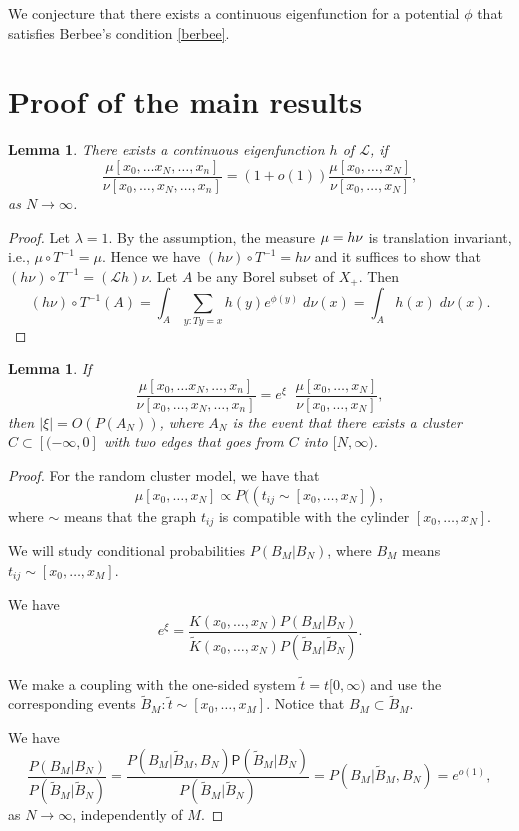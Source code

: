 \documentclass[11pt, a4paper, oneside]{article}
\newtheorem{lem}[thm]{Lemma}
\theoremstyle{definition}
\theoremstyle{remark}
\renewcommand{\P}{\mathsf{P}}
\providecommand{\tl}{\tilde}
\begin{document}
We conjecture that there exists a continuous eigenfunction for a potential
$\phi$ that satisfies Berbee's condition \eqref{berbee}.

\section{Proof of the main results}\noindent
\begin{lem}
  There exists a continuous eigenfunction $h$ of ${\mathcal L}$, if
$$\frac{\mu[x_0,\ldots x_N, \ldots, x_n]}{\nu[x_0,\ldots, x_N, \ldots, x_n]}=(1+o(1)) \frac{\mu[x_0,\ldots, x_N]}{\nu[x_0, \ldots, x_N]},$$
as $N\to \infty$.
\end{lem}
\begin{proof}
  Let $\lambda=1$. By the assumption, the measure $\mu= h \nu$ is translation
  invariant, i.e., $\mu\circ T^{-1}=\mu$. Hence we have $(h\nu)\circ
  T^{-1}=h\nu$ and it suffices to show that $(h\nu)\circ T^{-1}=({\mathcal
    L}h)\nu$. Let $A$ be any Borel subset of $X_+$. Then
$$(h\nu)\circ T^{-1} (A)=\int_A \sum_{y: Ty=x} h(y)e^{\phi(y)}\; d\nu(x)=\int_A h(x)\; d\nu(x).$$
\end{proof}

\begin{lem}
  If $$\frac{\mu[x_0,\ldots x_N, \ldots, x_n]}{\nu[x_0,\ldots, x_N, \ldots,
    x_n]}=e^{\xi}\; \; \frac{\mu[x_0,\ldots, x_N]}{\nu[x_0, \ldots, x_N]},$$
then $|\xi|=O(P(A_N))$, where $A_N$ is the event that there exists a cluster
$C\subset [(-\infty, 0]$ with two edges that goes from $C$ into $[N,\infty)$.
\end{lem}
\begin{proof}
For the random cluster model, we have that
$$\mu[x_0,\ldots, x_N]\propto P((t_{ij} \sim [x_0, \ldots, x_N]),$$
where $\sim$ means that the graph $t_{ij}$ is compatible with the cylinder
$[x_0,\ldots, x_N]$.

We will study conditional probabilities $P(B_M|B_N)$, where $B_M$ means
$t_{ij}\sim [x_0,\ldots, x_M]$.

We have
$$e^{\xi}=\frac{K(x_0,\ldots, x_N)P(B_M|B_N)}{\tl K(x_0,\ldots, x_N)P(\tilde B_M|\tilde B_N)}.$$

We make a coupling with the one-sided system $\tilde t=t[0,\infty)$ and use the
corresponding events $\tilde B_M: \tilde t \sim [x_0,\ldots, x_M]$. Notice that
$B_M\subset \tilde B_M$.

We have
$$ 
\frac{P(B_M|B_N)}{P(\tilde B_M| \tilde B_N)}= \frac{P(B_M|\tilde B_M, B_N)
  \P(\tilde B_M|B_N)} {P(\tilde B_M|\tilde B_N)}=P(B_M|\tilde B_M,
B_N)=e^{o(1)},
$$
as $N\to \infty$, independently of $M$.
\end{proof}
\end{document}
